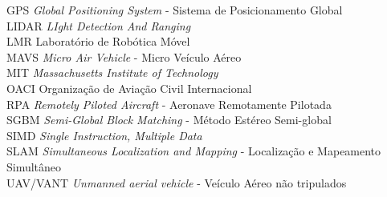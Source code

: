\begin{tabbing}
\> GPS 	 	\> \textit{Global Positioning System} - Sistema de Posicionamento Global						\\
\> LIDAR 	\> \textit{LIght Detection And Ranging}											\\
\> LMR 	 	\> Laboratório de Robótica Móvel											\\
\> MAVS  	\> \textit{Micro Air Vehicle} - Micro Veículo Aéreo									\\
\> MIT 	 	\> \textit{Massachusetts Institute of Technology}									\\
\> OACI  	\> Organização de Aviação Civil Internacional 										\\
\> RPA 	 	\> \textit{Remotely Piloted Aircraft} - Aeronave Remotamente Pilotada							\\
\> SGBM  	\> \textit{Semi-Global Block Matching} - Método Estéreo Semi-global							\\
\> SIMD  	\> \textit{Single Instruction, Multiple Data}										\\
\> SLAM  	\> \textit{Simultaneous Localization and Mapping} - Localização e Mapeamento Simultâneo					\\
\> UAV/VANT 	\> \textit{Unmanned aerial vehicle} - Veículo Aéreo não tripulados 							\\

\end{tabbing}
\cleardoublepage
\pagestyle{fancy}
\fancyhf{} %
\fancyhead[RO, LE] {\thepage}


\tableofcontents %
